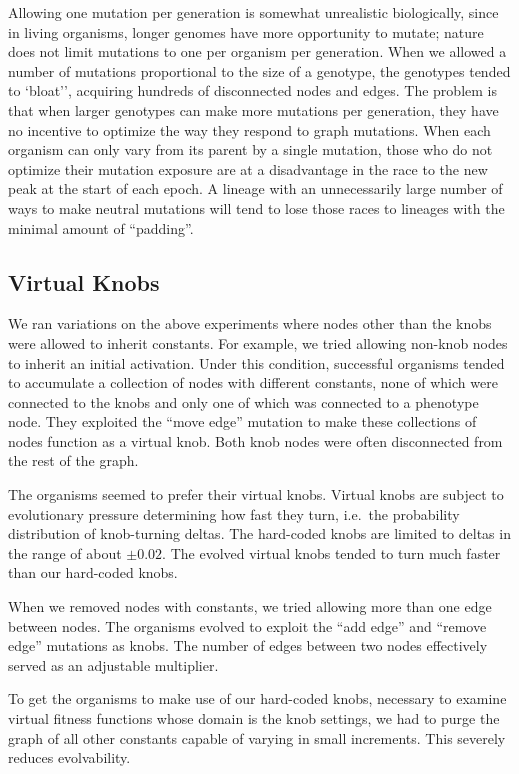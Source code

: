\documentclass[letterpaper]{article}
\begin{document}
Allowing one mutation per generation is somewhat unrealistic biologically,
since in living organisms, longer genomes have more opportunity to mutate;
nature does not limit mutations to one per organism per generation. When we
allowed a number of mutations proportional to the size of a genotype, the
genotypes tended to `bloat'', acquiring hundreds of disconnected nodes and
edges. The problem is that when larger genotypes can make more mutations per
generation, they have no incentive to optimize the way they respond to graph
mutations.  When each organism can only vary from its parent by a single
mutation, those who do not optimize their mutation exposure are at a
disadvantage in the race to the new peak at the start of each epoch. A lineage
with an unnecessarily large number of ways to make neutral mutations will tend
to lose those races to lineages with the minimal amount of ``padding''.

\subsection{Virtual Knobs}

We ran variations on the above experiments where nodes other than the knobs were
allowed to inherit constants. For example, we tried allowing non-knob nodes to
inherit an initial activation. Under this condition, successful organisms tended
to accumulate a collection of nodes with different constants, none of which were
connected to the knobs and only one of which was connected to a phenotype node.
They exploited the ``move edge'' mutation to make these collections of nodes
function as a virtual knob. Both knob nodes were often disconnected from the
rest of the graph.

The organisms seemed to prefer their virtual knobs. Virtual knobs are subject to
evolutionary pressure determining how fast they turn, i.e.~the probability
distribution of knob-turning deltas. The hard-coded knobs are limited to deltas
in the range of about $\pm0.02$. The evolved virtual knobs tended to turn much
faster than our hard-coded knobs.

When we removed nodes with constants, we tried allowing more than one edge
between nodes. The organisms evolved to exploit the ``add edge'' and ``remove
edge'' mutations as knobs. The number of edges between two nodes effectively
served as an adjustable multiplier.

To get the organisms to make use of our hard-coded knobs, necessary to examine
virtual fitness functions whose domain is the knob settings, we had to purge
the graph of all other constants capable of varying in small increments. This
severely reduces evolvability.
\end{document}
